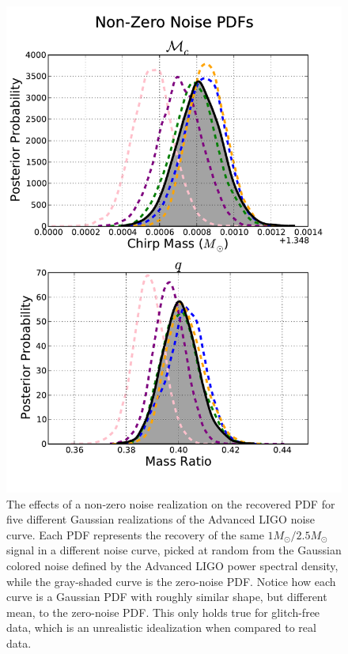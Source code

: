 \documentclass[11pt,a4paper]{emulateapj} 
\begin{document}
\begin{figure}[ht!]
  \centering \includegraphics[trim=0cm 0cm 0cm 0cm,
    clip=true,scale=0.52]{noisePDF.pdf}
 \caption{The effects of a non-zero noise realization on the recovered
   PDF for five different Gaussian realizations of the Advanced LIGO
   noise curve.  Each PDF represents the recovery of the same
   $1M_{\odot}/2.5M_{\odot}$ signal in a different noise curve, picked
   at random from the Gaussian colored noise defined by the Advanced
   LIGO power spectral density, while the gray-shaded curve is the
   zero-noise PDF.  Notice how each curve is a Gaussian PDF with roughly similar shape,
   but different mean, to the zero-noise PDF.  This
   only holds true for glitch-free data, which is an unrealistic
   idealization when compared to real data.}
 \label{noisePDFs}
\end{figure}
  
\end{document}
